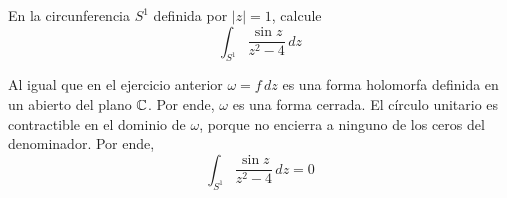 \begin{exercise}
En la circunferencia $S^1$ definida por $|z| = 1$, calcule
$$\int_{S^1} \frac {\sin z} {z^2 - 4} \, dz$$
\end{exercise}

\begin{solution}
Al igual que en el ejercicio anterior $\omega = f \, dz$ es una forma holomorfa definida en un abierto del plano $\mathbb C$. Por ende, $\omega$ es una forma cerrada. El círculo unitario es contractible en el dominio de $\omega$, porque no encierra a ninguno de los ceros del denominador. Por ende,
$$\int_{S^1} \frac {\sin z} {z^2 - 4} \, dz = 0$$
\end{solution}
